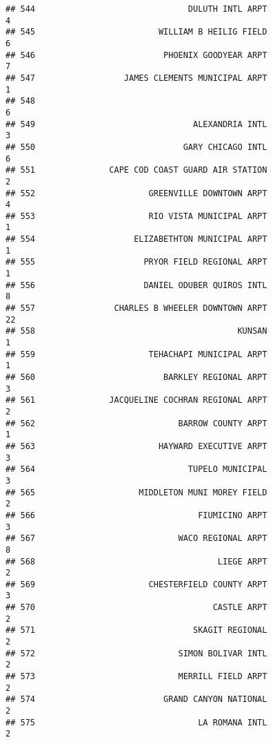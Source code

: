 \documentclass[
]{article}
\begin{document}
\begin{verbatim}
## 544                               DULUTH INTL ARPT                           4
## 545                         WILLIAM B HEILIG FIELD                           6
## 546                          PHOENIX GOODYEAR ARPT                           7
## 547                  JAMES CLEMENTS MUNICIPAL ARPT                           1
## 548                                                                          6
## 549                                ALEXANDRIA INTL                           3
## 550                              GARY CHICAGO INTL                           6
## 551               CAPE COD COAST GUARD AIR STATION                           2
## 552                       GREENVILLE DOWNTOWN ARPT                           4
## 553                       RIO VISTA MUNICIPAL ARPT                           1
## 554                    ELIZABETHTON MUNICIPAL ARPT                           1
## 555                      PRYOR FIELD REGIONAL ARPT                           1
## 556                      DANIEL ODUBER QUIROS INTL                           8
## 557                CHARLES B WHEELER DOWNTOWN ARPT                          22
## 558                                         KUNSAN                           1
## 559                       TEHACHAPI MUNICIPAL ARPT                           1
## 560                          BARKLEY REGIONAL ARPT                           3
## 561               JACQUELINE COCHRAN REGIONAL ARPT                           2
## 562                             BARROW COUNTY ARPT                           1
## 563                         HAYWARD EXECUTIVE ARPT                           3
## 564                               TUPELO MUNICIPAL                           3
## 565                     MIDDLETON MUNI MOREY FIELD                           2
## 566                                 FIUMICINO ARPT                           3
## 567                             WACO REGIONAL ARPT                           8
## 568                                     LIEGE ARPT                           2
## 569                       CHESTERFIELD COUNTY ARPT                           3
## 570                                    CASTLE ARPT                           2
## 571                                SKAGIT REGIONAL                           2
## 572                             SIMON BOLIVAR INTL                           2
## 573                             MERRILL FIELD ARPT                           2
## 574                          GRAND CANYON NATIONAL                           2
## 575                                 LA ROMANA INTL                           2

\end{verbatim}
\end{document}
